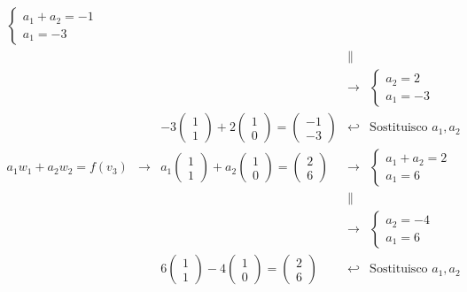 \documentclass[a4paper]{article}
\begin{document}
\begin{equation*}
\begin{array}{rllll}
\begin{cases}
				a_{1} + a_{2} = -1 \\
				a_{1} = -3
			\end{cases} \\
			&& &\parallel& \\
			&& &\rightarrow& \begin{cases}
				a_{2} = 2 \\
				a_{1} = -3
			\end{cases} \\
			&& -3\begin{pmatrix}
				1 \\ 1
			\end{pmatrix} + 2\begin{pmatrix}
				1 \\ 0
			\end{pmatrix} = \begin{pmatrix}
				-1 \\ -3
			\end{pmatrix} &\hookleftarrow& \text{Sostituisco } a_{1},a_{2} \\ [1.8em]
			a_{1}w_{1} + a_{2}w_{2} = f\left(v_{3}\right) &\rightarrow& a_{1}\begin{pmatrix}
				1 \\ 1
			\end{pmatrix} + a_{2}\begin{pmatrix}
				1 \\ 0
			\end{pmatrix} = \begin{pmatrix}
				2 \\ 6
			\end{pmatrix} &\rightarrow& \begin{cases}
				a_{1} + a_{2} = 2 \\
				a_{1} = 6
			\end{cases}  \\
			&& &\parallel& \\
			&& &\rightarrow& \begin{cases}
				a_{2} = -4 \\
				a_{1} = 6
			\end{cases} \\
			&& 6\begin{pmatrix}
				1 \\ 1
			\end{pmatrix} - 4\begin{pmatrix}
				1 \\ 0
			\end{pmatrix} = \begin{pmatrix}
				2 \\ 6
			\end{pmatrix} &\hookleftarrow& \text{Sostituisco } a_{1},a_{2}
		\end{array}
	\end{equation*}
\end{document}
